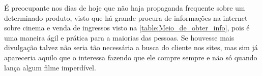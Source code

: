 \documentclass[12pt]{article}
\begin{document}
      \begin{table}[h]
            \centering
            \caption{Com que frequência você vê divulgações de vendas de ingressos?}
            \label{table:freq_divulgacao}
        \end{table}
        \FloatBarrier
        
    É preocupante nos dias de hoje que não haja propaganda frequente sobre um determinado produto, visto que há grande procura de informações na internet sobre cinema e venda de ingressos visto na \ref{table:Meio_de_obter_info}, pois é uma maneira ágil e prática para a maiorias das pessoas. Se houvesse mais divulgação talvez não seria tão necessária a busca do cliente nos sites, mas sim já apareceria aquilo que o interessa fazendo que ele compre sempre e não só quando lança algum filme imperdível.
    
\end{document}
